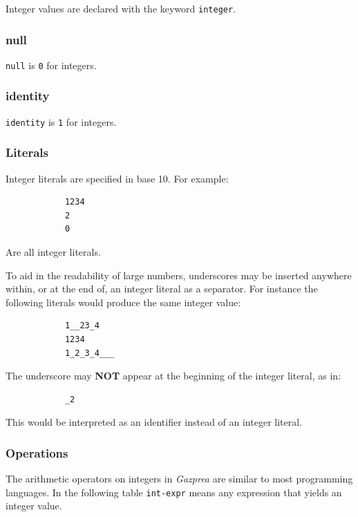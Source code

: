 \documentclass{article}
\begin{document}
		Integer values are declared with the keyword \texttt{integer}.

	\subsubsection{null}

		\texttt{null} is \texttt{0} for integers.

	\subsubsection{identity}

		\texttt{identity} is \texttt{1} for integers.

	\subsubsection{Literals}

		Integer literals are specified in base 10. For example:

		\begin{lstlisting}
			1234
			2
			0
		\end{lstlisting}

		Are all integer literals.

		To aid in the readability of large numbers, underscores may be inserted anywhere within, or at the end of, an
		integer literal as a separator. For instance the following literals would produce the same integer value:

		\begin{lstlisting}
			1__23_4
			1234
			1_2_3_4___
		\end{lstlisting}

		The underscore may \textbf{NOT} appear at the beginning of the integer literal, as in:

		\begin{lstlisting}
			_2
		\end{lstlisting}

		This would be interpreted as an identifier instead of an integer literal.

	\subsubsection{Operations}

		The arithmetic operators on integers in \textit{Gazprea} are similar to most programming languages. In the
		following table \texttt{int-expr} means any expression that yields an integer value.
\end{document}
